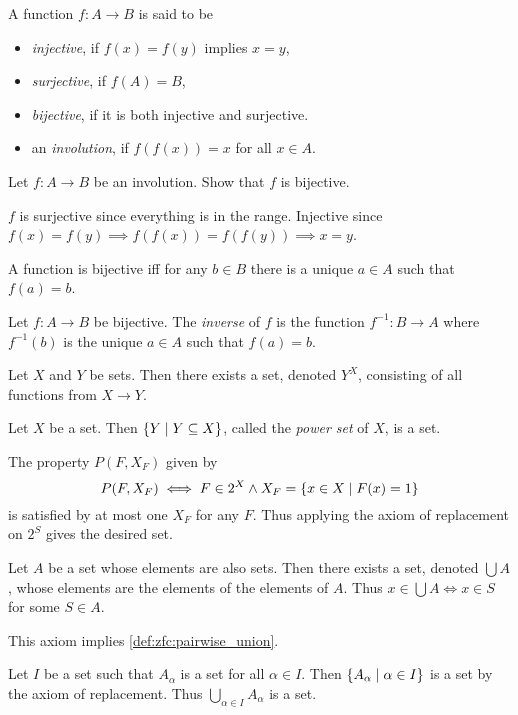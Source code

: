 
\begin{definition}
    A function $f\colon A \to B$ is said to be
    \begin{itemize}
        \item \emph{injective}, if $f(x) = f(y)$ implies $x = y$,
        \item \emph{surjective}, if $f(A) = B$,
        \item \emph{bijective}, if it is both injective and surjective.
        \item an \emph{involution}, if $f(f(x)) = x$ for all $x \in A$.
    \end{itemize}
\end{definition}
\begin{exercise}
    Let $f\colon A \to B$ be an involution.
    Show that $f$ is bijective.
\end{exercise}
\begin{solution}
    $f$ is surjective since everything is in the range.
    Injective since $f(x) = f(y) \implies f(f(x)) = f(f(y)) \implies x = y$.
\end{solution}

A function is bijective iff for any $b \in B$ there is a unique $a \in A$
such that $f(a) = b$.
\begin{definition}
    Let $f\colon A \to B$ be bijective.
    The \emph{inverse} of $f$ is the function $f^{-1}\colon B \to A$
    where $f^{-1}(b)$ is the unique $a \in A$ such that $f(a) = b$.
\end{definition}

\begin{axiom}[Powers] \label{def:zfc:powers}
    Let $X$ and $Y$ be sets.
    Then there exists a set, denoted $Y^X$, consisting of all functions
    from $X \to Y$.
\end{axiom}
\begin{exercise*}
    Let $X$ be a set.
    Then $\set{Y \mid Y \subseteq X}$, called the \emph{power set} of $X$,
    is a set.
\end{exercise*}
\begin{solution}
    The property $P(F, X_F)$ given by \[
        P(F, X_F) \iff F \in 2^X \land X_F = \set{x \in X \mid F(x) = 1}
    \] is satisfied by at most one $X_F$ for any $F$.
    Thus applying the axiom of replacement on $2^S$ gives the desired set.
\end{solution}

\begin{axiom}[Unions] \label{def:zfc:unions}
    Let $A$ be a set whose elements are also sets.
    Then there exists a set, denoted $\bigcup A$, whose elements are the
    elements of the elements of $A$.
    Thus $x \in \bigcup A \iff x \in S$ for some $S \in A$.
\end{axiom}
\begin{remark}
    This axiom implies \cref{def:zfc:pairwise_union}.

    Let $I$ be a set such that $A_\alpha$ is a set for all $\alpha \in I$.
    Then $\set{A_\alpha \mid \alpha \in I}$ is a set by the axiom of
    replacement.
    Thus $\bigcup_{\alpha \in I} A_\alpha$ is a set.
\end{remark}

